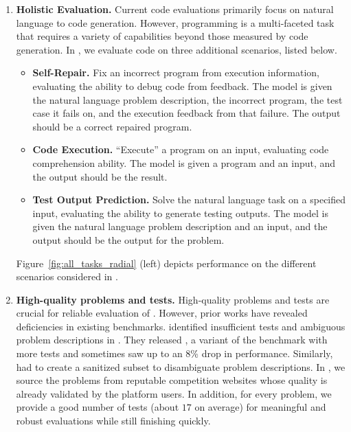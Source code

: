 \begin{enumerate}
    \item \textbf{Holistic Evaluation.} 
    Current code evaluations primarily focus on natural language to code generation. 
    However, programming is a multi-faceted task that requires a variety of capabilities beyond those measured by code generation. 
    In \livecodebench{}, we evaluate code \llms{} on three additional scenarios, listed below. 
    \begin{itemize}
    \item \textbf{Self-Repair.} Fix an incorrect program from execution information, evaluating the ability to debug code from feedback. The model is given the natural language problem description, the incorrect program, the test case it fails on, and the execution feedback from that failure. The output should be a correct repaired program.
    \item \textbf{Code Execution.} ``Execute'' a program on an input, evaluating code comprehension ability. The model is given a program and an input, and the output should be the result.
    \item \textbf{Test Output Prediction.} Solve the natural language task on a specified input, evaluating the ability to generate testing outputs. The model is given the natural language problem description and an input, and the output should be the output for the problem.
    \end{itemize}
    Figure~\ref{fig:all_tasks_radial} (left) depicts performance on the different scenarios considered in \livecodebench{}. 
    \item \textbf{High-quality problems and tests.}
    High-quality problems and tests are crucial for reliable evaluation of \llms{}.
    However, prior works have revealed deficiencies in existing benchmarks. 
    \citep{liu2023evaluating} identified insufficient tests and ambiguous problem descriptions in \humaneval{}. They released \humanevalplus{}, a variant of the benchmark with more tests and sometimes saw up to an 8\% drop in performance. 
    Similarly, \citep{austin2021program} had to create a sanitized \mbpp{} subset to disambiguate problem descriptions.
    In \livecodebench{}, we source the problems from reputable competition websites whose quality is already validated
    by the platform users.
    In addition, for every problem, we provide a good number of tests (about $17$ on average) for meaningful and robust evaluations while still finishing quickly.
    

\end{enumerate}
